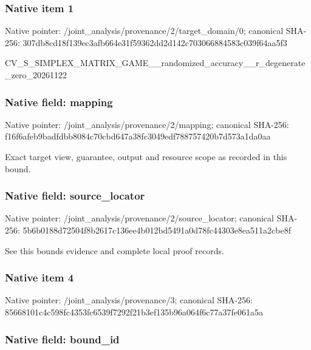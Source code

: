 \documentclass[10pt,a4paper]{article}
\begin{document}
\subsubsection{Native item 1}


Native pointer: /joint\_analysis/provenan\allowbreak{}ce/2/target\_domain/0; canonical SHA-256: 307db8cd18f139ec3afb664e\allowbreak{}31f59362dd2d142c70306688\allowbreak{}4583c039f64aa5f3


CV\_S\_SIMPLEX\_MATRIX\_GAME\allowbreak{}\_\_randomized\_accuracy\_\_r\allowbreak{}\_degenerate\_zero\_2026112\allowbreak{}2


\subsubsection{Native field: mapping}


Native pointer: /joint\_analysis/provenance/2/mapping; canonical SHA-256: f16f6afeb9badfdbb8084c70\allowbreak{}cbd647a38fc3049edf788757\allowbreak{}420b7d573a1da0aa


Exact target view, guarantee, output and resource scope as recorded in this bound.


\subsubsection{Native field: source\_locator}


Native pointer: /joint\_analysis/provenan\allowbreak{}ce/2/source\_locator; canonical SHA-256: 5b6b0188d72504f8b2617c13\allowbreak{}6ee4b012bd5491a0d78fc443\allowbreak{}03e8ea511a2cbe8f


See this bounds evidence and complete local proof records.


\subsubsection{Native item 4}


Native pointer: /joint\_analysis/provenance/3; canonical SHA-256: 85668101c4c598fc4353fc65\allowbreak{}39f7292f21b3ef135b96a064\allowbreak{}f6c77a37fe061a5a



\subsubsection{Native field: bound\_id}
\end{document}

